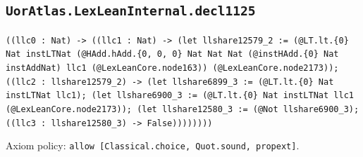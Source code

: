 \documentclass[11pt]{article}
\begin{document}
\subsection*{\texttt{UorAtlas.LexLeanInternal.decl1125}}
\noindent\texttt{((llc0 : Nat) -> ((llc1 : Nat) -> (let llshare12579\_2 := (@LT.lt.\{0\} Nat instLTNat (@HAdd.hAdd.\{0, 0, 0\} Nat Nat Nat (@instHAdd.\{0\} Nat instAddNat) llc1 (@LexLeanCore.node163)) (@LexLeanCore.node2173)); ((llc2 : llshare12579\_2) -> (let llshare6899\_3 := (@LT.lt.\{0\} Nat instLTNat llc1); (let llshare6900\_3 := (@LT.lt.\{0\} Nat instLTNat llc1 (@LexLeanCore.node2173)); (let llshare12580\_3 := (@Not llshare6900\_3); ((llc3 : llshare12580\_3) -> False))))))))}\par
\noindent Axiom policy: \texttt{allow [Classical.choice, Quot.sound, propext]}.\par
\end{document}
